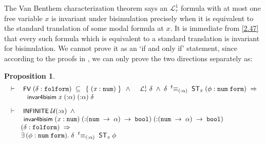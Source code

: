 \documentclass{llncs}
\newtheorem{prop}[thm]{Proposition}
\newenvironment{holmath}{\begin{displaymath}\begin{array}{l}}{\end{array}\end{displaymath}\ignorespacesafterend}
\renewcommand{\HOLConst}[1]{{\textsf{\upshape\small #1}}}
\begin{document}
The Van Benthem characterization theorem says an $\mathcal L_{\tau}^1$ formula with at most one free variable $x$ is invariant under bisimulation precisely when it is equivalent to the standard translation of some modal formula at $x$. It is immediate from \ref{2.47} that every such formula which is equivalent to a standard translation is invariant for bisimulation. We cannot prove it as an `if and only if' statement, since according to the proofs in \cite{Blackburn}, we can only prove the two directions separately as:
\begin{prop}
{\upshape\cite[Theorem 2.68, as two separate directions]{Blackburn}}
\begin{holmath}
  \ensuremath{\HOLTokenTurnstile}\HOLConst{FV}\;(\HOLFreeVar{\ensuremath{\delta}} :\HOLTyOp{folform})\;\HOLSymConst{\HOLTokenSubset{}}\;\HOLTokenLeftbrace{}(\HOLFreeVar{x} :\HOLTyOp{num})\HOLTokenRightbrace{}\;\HOLSymConst{\HOLTokenConj{}}\;\HOLConst{\ensuremath{{\mathcal L}^1_\tau}}\;\HOLFreeVar{\ensuremath{\delta}}\;\HOLSymConst{\HOLTokenConj{}}\;\HOLFreeVar{\ensuremath{\delta}}\;\;{}\sp{\sf f}{\equiv}\sb{({:}\ensuremath{\alpha})}\;\;{\sf ST}\sb{\HOLFreeVar{x}}\;(\HOLFreeVar{\ensuremath{\phi}} :\HOLTyOp{num}\;\HOLTyOp{form})\;\HOLSymConst{\HOLTokenImp{}}\\
\;\;\;\;\;\;\;\HOLConst{invar4bisim}\;\HOLFreeVar{x}\;({:}\ensuremath{\alpha})\;({:}\ensuremath{\alpha})\;\HOLFreeVar{\ensuremath{\delta}} \\[3mm]
 \ensuremath{\HOLTokenTurnstile}\HOLConst{INFINITE}\;\ensuremath{{\cal{U}}}({:}\ensuremath{\alpha})\;\HOLSymConst{\HOLTokenConj{}}\\
\;\;\;\;\;\HOLConst{invar4bisim}\;(\HOLFreeVar{x} :\HOLTyOp{num})\;({:}(\HOLTyOp{num}\;\ensuremath{\rightarrow}\;\ensuremath{\alpha})\;\ensuremath{\rightarrow}\;\HOLTyOp{bool})\;({:}(\HOLTyOp{num}\;\ensuremath{\rightarrow}\;\ensuremath{\alpha})\;\ensuremath{\rightarrow}\;\HOLTyOp{bool})\\
\;\;\;\;\;\;\;(\HOLFreeVar{\ensuremath{\delta}} :\HOLTyOp{folform})\;\HOLSymConst{\HOLTokenImp{}}\\
\;\;\;\;\;\;\;\HOLSymConst{\HOLTokenExists{}}(\HOLBoundVar{\ensuremath{\phi}} :\HOLTyOp{num}\;\HOLTyOp{form}).\;\HOLFreeVar{\ensuremath{\delta}}\;\;{}\sp{\sf f}{\equiv}\sb{({:}\ensuremath{\alpha})}\;\;{\sf ST}\sb{\HOLFreeVar{x}}\;\HOLBoundVar{\ensuremath{\phi}}
\end{holmath}
\end{prop}
\end{document}

